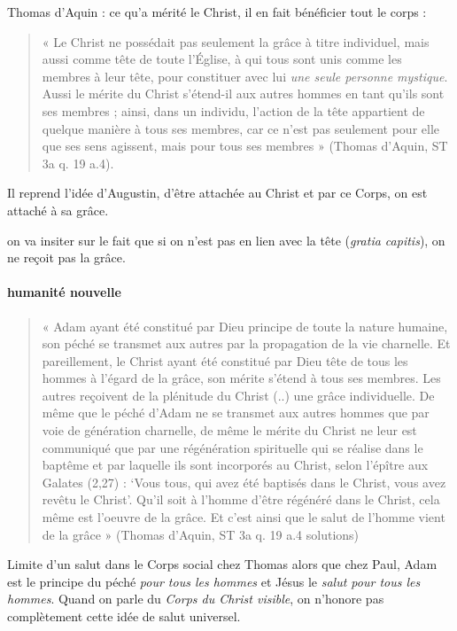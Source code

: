 Thomas d'Aquin : ce qu'a mérité le Christ, il en fait bénéficier tout le corps : 
\begin{quote}
    « Le Christ ne possédait pas seulement la grâce à titre individuel, mais aussi comme tête de
toute l’Église, à qui tous sont unis comme les membres à leur tête, pour constituer avec lui
\textit{une seule personne mystique}. Aussi le mérite du Christ s’étend-il aux autres hommes en tant
qu’ils sont ses membres ; ainsi, dans un individu, l’action de la tête appartient de quelque
manière à tous ses membres, car ce n’est pas seulement pour elle que ses sens agissent, mais
pour tous ses membres » (Thomas d’Aquin, ST 3a q. 19 a.4).
\end{quote}

Il reprend l'idée d'Augustin, d'être attachée au Christ et par ce Corps, on est attaché à sa grâce.

\begin{Synthesis}
on va insiter sur le fait que si on n'est pas en lien avec la tête (\textit{gratia capitis}), on ne reçoit pas la grâce.
\end{Synthesis}

\paragraph{humanité nouvelle}
\begin{quote}
« Adam ayant été constitué par Dieu principe de toute la nature humaine, son péché se
transmet aux autres par la propagation de la vie charnelle. Et pareillement, le Christ ayant été
constitué par Dieu tête de tous les hommes à l’égard de la grâce, son mérite s’étend à tous ses
membres. Les autres reçoivent de la plénitude du Christ (..) une grâce individuelle. De même
que le péché d’Adam ne se transmet aux autres hommes que par voie de génération charnelle,
de même le mérite du Christ ne leur est communiqué que par une régénération spirituelle qui
se réalise dans le baptême et par laquelle ils sont incorporés au Christ, selon l’épître aux
Galates (2,27) : ‘Vous tous, qui avez été baptisés dans le Christ, vous avez revêtu le Christ’.
Qu’il soit à l’homme d’être régénéré dans le Christ, cela même est l’oeuvre de la grâce. Et
c’est ainsi que le salut de l’homme vient de la grâce » (Thomas d’Aquin, ST 3a q. 19 a.4
solutions)
\end{quote}

Limite d'un salut dans le Corps social chez Thomas alors que chez Paul, Adam est le principe du péché \textit{pour tous les hommes} et Jésus le \textit{salut pour tous les hommes}. Quand on parle du \textit{Corps du Christ visible}, on n'honore pas complètement cette idée de salut universel.

